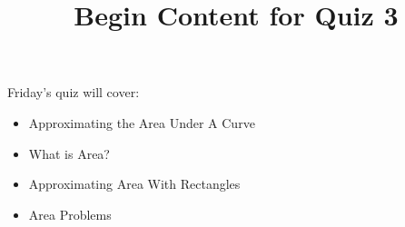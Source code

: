 \documentclass{ximera}
\title{Begin Content for Quiz 3}
\begin{document}
\begin{abstract}
\end{abstract}

\maketitle

\begin{sectionOutcomes}

Friday's quiz will cover:




\begin{itemize}
\item Approximating the Area Under A Curve
\item What is Area?
\item Approximating Area With Rectangles
\item Area Problems
\end{itemize}

\end{sectionOutcomes}
\end{document}
